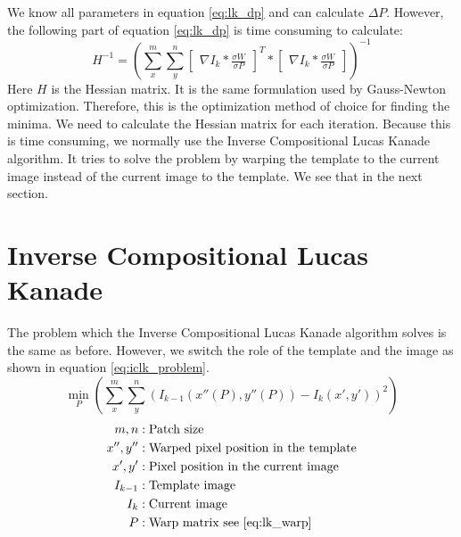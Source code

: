 \documentclass[11pt,a4paper,titlepage,oneside]{report}
\begin{document}
We know all parameters in equation \ref{eq:lk_dp} and can calculate $\Delta P$. However, the following part of equation \ref{eq:lk_dp} is time consuming to calculate:
\begin{equation}
  H^{-1}=(\sum_x^m\sum_y^n\begin{bmatrix}\nabla I_{k}*\frac{\sigma W}{\sigma P}\end{bmatrix}^T*\begin{bmatrix}\nabla I_{k}*\frac{\sigma W}{\sigma P}\end{bmatrix})^{-1}
\end{equation}
Here $H$ is the Hessian matrix. It is the same formulation used by Gauss-Newton optimization. Therefore, this is the optimization method of choice for finding the minima. We need to calculate the Hessian matrix for each iteration. Because this is time consuming, we normally use the Inverse Compositional Lucas Kanade algorithm. It tries to solve the problem by warping the template to the current image instead of the current image to the template. We see that in the next section.

\section{Inverse Compositional Lucas Kanade}\label{sec:inv_comp_lk}
The problem which the Inverse Compositional Lucas Kanade algorithm solves is the same as before. However, we switch the role of the template and the image as shown in equation \ref{eq:iclk_problem}.
\begin{equation}\label{eq:iclk_problem}
  \min_P(\sum_x^m\sum_y^n(I_{k-1}(x''(P),y''(P))-I_{k}(x',y'))^2)
\end{equation}
\begin{align*}
  m,n        &: \text{Patch size}\\
  x'',y''    &: \text{Warped pixel position in the template}\\
  x',y'      &: \text{Pixel position in the current image}\\
  I_{k-1}    &: \text{Template image}\\
  I_{k}      &: \text{Current image}\\
  P          &: \text{Warp matrix see \ref{eq:lk_warp}}
\end{align*}
\end{document}
